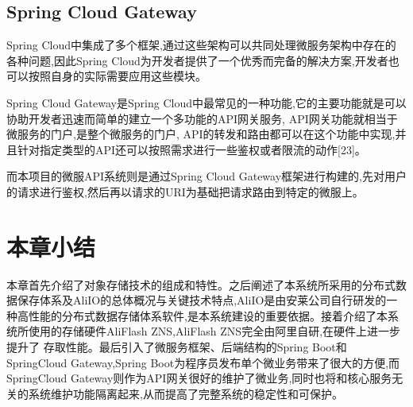\subsection{Spring Cloud Gateway}




Spring Cloud中集成了多个框架,通过这些架构可以共同处理微服务架构中存在的各种问题,因此Spring Cloud为开发者提供了一个优秀而完备的解决方案,开发者也可以按照自身的实际需要应用这些模块。

Spring Cloud Gateway是Spring Cloud中最常见的一种功能,它的主要功能就是可以协助开发者迅速而简单的建立一个多功能的API网关服务, API网关功能就相当于微服务的门户,是整个微服务的门户, API的转发和路由都可以在这个功能中实现,并且针对指定类型的API还可以按照需求进行一些鉴权或者限流的动作[23]。

而本项目的微服API系统则是通过Spring Cloud Gateway框架进行构建的,先对用户的请求进行鉴权,然后再以请求的URI为基础把请求路由到特定的微服上。

\section{本章小结}


本章首先介绍了对象存储技术的组成和特性。之后阐述了本系统所采用的分布式数据保存体系及AliIO的总体概况与关键技术特点,AliIO是由安莱公司自行研发的一种高性能的分布式数据存储体系软件,是本系统建设的重要依据。接着介绍了本系统所使用的存储硬件AliFlash ZNS,AliFlash ZNS完全由阿里自研,在硬件上进一步提升了
存取性能。最后引入了微服务框架、后端结构的Spring Boot和SpringCloud Gateway,Spring Boot为程序员发布单个微业务带来了很大的方便,而SpringCloud Gateway则作为API网关很好的维护了微业务,同时也将和核心服务无关的系统维护功能隔离起来,从而提高了完整系统的稳定性和可保护。

